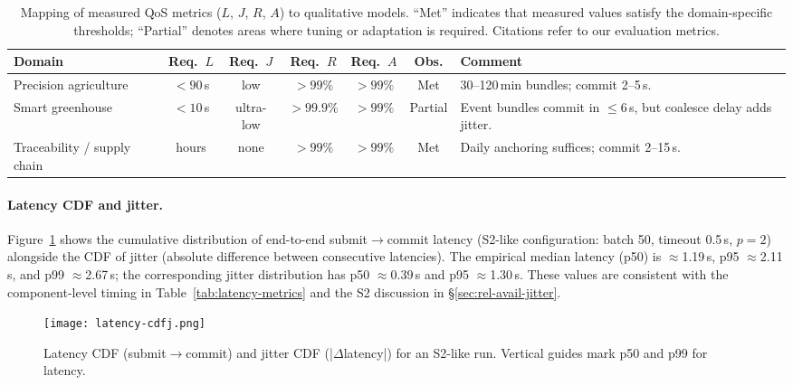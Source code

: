 \documentclass[12pt,onecolumn]{IEEEtran} %
\renewcommand{\arraystretch}{1.2} %
\begin{document}
\begin{table}[htbp]
  \centering
  \caption{Mapping of measured QoS metrics ($L$, $J$, $R$, $A$) to qualitative models. ``Met'' indicates that measured values satisfy the domain-specific thresholds; ``Partial'' denotes areas where tuning or adaptation is required. Citations refer to our evaluation metrics.}
  \label{tab:qos-map}
  \footnotesize
  \setlength{\tabcolsep}{3.5pt} %
  \renewcommand{\arraystretch}{1.12}
  \begin{tabularx}{\linewidth}{@{}l c c c c c X@{}}
    \toprule
    \textbf{Domain} & \textbf{Req.\ $L$} & \textbf{Req.\ $J$} & \textbf{Req.\ $R$} & \textbf{Req.\ $A$} & \textbf{Obs.} & \textbf{Comment} \\
    \midrule
    Precision agriculture & $<90$\,s & low & $>99\%$ & $>99\%$ & Met &
      30--120\,min bundles; commit 2--5\,s. \\
    Smart greenhouse & $<10$\,s & ultra-low & $>99.9\%$ & $>99\%$ & Partial &
      Event bundles commit in $\le 6$\,s, but coalesce delay adds jitter. \\
    Traceability / supply chain & hours & none & $>99\%$ & $>99\%$ & Met &
      Daily anchoring suffices; commit 2--15\,s. \\
    \bottomrule
  \end{tabularx}
\end{table}
\paragraph{Latency CDF and jitter.}

Figure~\ref{fig:latency-cdf} shows the cumulative distribution of end-to-end submit$\to$commit latency (S2-like configuration: batch 50, timeout 0.5\,s, $p{=}2$) alongside the CDF of jitter (absolute difference between consecutive latencies). The empirical median latency (p50) is \(\approx\)1.19\,s, p95 \(\approx\)2.11\,s, and p99 \(\approx\)2.67\,s; the corresponding jitter distribution has p50 \(\approx\)0.39\,s and p95 \(\approx\)1.30\,s. These values are consistent with the component-level timing in Table~\ref{tab:latency-metrics} and the S2 discussion in \S\ref{sec:rel-avail-jitter}.

\begin{figure}[h]
  \centering
  \texttt{[image: latency-cdfj.png]}
  \caption{Latency CDF (submit$\to$commit) and jitter CDF (|$\Delta$latency|) for an S2-like run. Vertical guides mark p50 and p99 for latency.}
  \label{fig:latency-cdf}
\end{figure}
\end{document}
